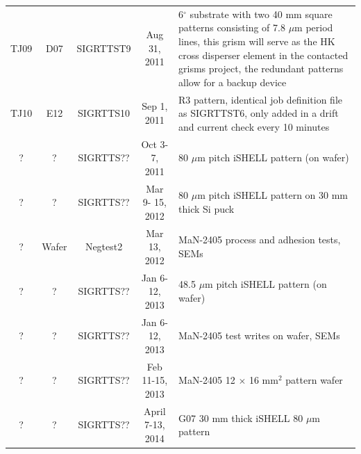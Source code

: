 \documentclass[]{spie}  %
\begin{document}
\begin{landscape}
\begin{longtable}{ccccp{8cm}}
	\cline{5-5}
	TJ09 & D07 & SIGRTTST9 & Aug 31, 2011 & 6$^{\circ}$ substrate with two 40 mm square patterns consisting of 7.8 $\mu$m period lines, this grism will serve as the HK cross disperser element in the contacted grisms project, the redundant patterns allow for a backup device\\	
	\cline{5-5}
	TJ10 & E12 & SIGRTTS10 & Sep 1, 2011 & R3 pattern, identical job definition file as SIGRTTST6, only added in a drift and current check every 10 minutes\\
	\cline{5-5}
	? & ? & SIGRTTS?? & Oct 3-7, 2011 & 80 $\mu$m pitch iSHELL pattern (on wafer) \\
	\cline{5-5}
	? & ? & SIGRTTS?? & Mar 9- 15, 2012 & 80 $\mu$m pitch iSHELL pattern on 30 mm thick Si puck \\	
	\cline{5-5}
	? & Wafer & Negtest2 & Mar 13, 2012 & MaN-2405 process and adhesion tests, SEMs\\		
	\cline{5-5}
	? & ? & SIGRTTS?? & Jan 6-12, 2013 & 48.5 $\mu$m pitch iSHELL pattern (on wafer) \\		
	\cline{5-5}
	? & ? & SIGRTTS?? & Jan 6-12, 2013 & MaN-2405 test writes on wafer, SEMs\\
	\cline{5-5}
	? & ? & SIGRTTS?? & Feb 11-15, 2013 & MaN-2405 12 $\times$ 16 mm$^2$ pattern wafer\\	
	\cline{5-5}
	? & ? & SIGRTTS?? & April 7-13, 2014 & G07 30 mm thick iSHELL 80 $\mu$m pattern\\
	\hline
\end{longtable}
\end{landscape}	



\end{document}
